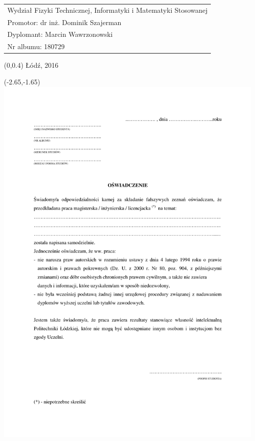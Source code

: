\documentclass[12pt, oneside, a4paper]{mwbk}
\begin{document}
\begin{titlepage}
\begin{center}
\selectfont
\hspace{-1cm}
\begin{tabular}{l}
Wydział Fizyki Technicznej, Informatyki i Matematyki Stosowanej \\
Promotor: dr inż. Dominik Szajerman \\
Dyplomant: Marcin Wawrzonowski \\
Nr albumu: 180729
\end{tabular}
\end{center}
\vspace{-.5cm}
\begin{center}
\selectfont
\begin{textblock}{13}(0,0.4)
Łódź, 2016
\end{textblock}
\end{center}
\end{titlepage}

\tableofcontents












\listoffigures

\listoftables

\newpage
\thispagestyle{empty}
\begin{textblock}{1}(-2.65,-1.65)
\includegraphics{figures/oswiadczenie_o_samodzielnosci.pdf}
\end{textblock}
\end{document}
